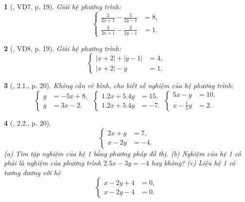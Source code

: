 \documentclass{article}
\newtheorem{baitoan}{}
\begin{document}
\begin{baitoan}[\cite{Binh_boi_duong_Toan_9_tap_2}, VD7, p. 19]
	Giải hệ phương trình:
	\begin{equation*}
		\left\{\begin{split}
			\frac{2}{2x + 1} - \frac{5}{2y - 1} &= 8,\\
			\frac{3}{2x + 1} - \frac{2}{2y - 1} &= 1.
		\end{split}\right.
	\end{equation*}
\end{baitoan}

\begin{baitoan}[\cite{Binh_boi_duong_Toan_9_tap_2}, VD8, p. 19]
	Giải hệ phương trình:
	\begin{equation*}
		\left\{\begin{split}
			|x + 2| + |y - 1| &= 4,\\
			|x + 2| - y &= 1.
		\end{split}\right.
	\end{equation*}
\end{baitoan}

\begin{baitoan}[\cite{Binh_boi_duong_Toan_9_tap_2}, 2.1., p. 20]
	Không cần vẽ hình, cho biết số nghiệm của hệ phương trình:
	\begin{equation*}
		\left\{\begin{split}
			y &= -5x + 8,\\
			y &= 3x - 2.
		\end{split}\right.\ 
		\left\{\begin{split}
			1.2x + 5.4y &= 15,\\
			1.2x + 5.4y &= -7.
		\end{split}\right.\ 
		\left\{\begin{split}
		5x - y &= 10,\\
		x - \frac{1}{5}y &= 2.
		\end{split}\right.
	\end{equation*}
\end{baitoan}

\begin{baitoan}[\cite{Binh_boi_duong_Toan_9_tap_2}, 2.2., p. 20]
	\begin{equation*}
		\left\{\begin{split}
			2x + y &= 7,\\
			x - 2y &= -4.
		\end{split}\right.
	\end{equation*}
	(a) Tìm tập nghiệm của hệ 1 bằng phương pháp đồ thị. (b) Nghiệm của hệ 1 có phải là nghiệm của phương trình $2.5x - 3y = -4$ hay không? (c) Liệu hệ 1 có tương đương với hệ
	\begin{equation*}
		\left\{\begin{split}
			x - 2y + 4 &= 0,\\
			x - 2y - 4 &= 0.
		\end{split}\right.
	\end{equation*}
\end{baitoan}
\end{document}
